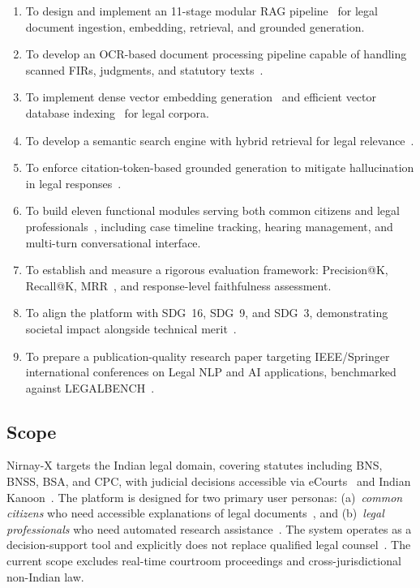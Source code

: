 \documentclass[12pt,a4paper]{article}
\begin{document}
\begin{enumerate}[leftmargin=*, label=\arabic*.]
  \item To design and implement an 11-stage modular RAG pipeline~\cite{lewis2020rag}
    for legal document ingestion, embedding, retrieval, and grounded generation.
  \item To develop an OCR-based document processing pipeline capable of handling
    scanned FIRs, judgments, and statutory texts~\cite{ecourts}.
  \item To implement dense vector embedding generation~\cite{reimers2019sbert} and
    efficient vector database indexing~\cite{manning2008ir} for legal corpora.
  \item To develop a semantic search engine with hybrid retrieval for legal
    relevance~\cite{manning2008ir, reimers2019sbert}.
  \item To enforce citation-token-based grounded generation to mitigate hallucination
    in legal responses~\cite{lewis2020rag}.
  \item To build eleven functional modules serving both common citizens and legal
    professionals~\cite{ashley2017ai}, including case timeline tracking, hearing
    management, and multi-turn conversational interface.
  \item To establish and measure a rigorous evaluation framework: Precision@K,
    Recall@K, MRR~\cite{manning2008ir}, and response-level faithfulness assessment.
  \item To align the platform with SDG~16, SDG~9, and SDG~3, demonstrating
    societal impact alongside technical merit~\cite{const_india, mlaw}.
  \item To prepare a publication-quality research paper targeting IEEE/Springer
    international conferences on Legal NLP and AI applications, benchmarked against
    LEGALBENCH~\cite{guha2023legalbench}.
\end{enumerate}

\subsection{Scope}

Nirnay-X targets the Indian legal domain, covering statutes including BNS, BNSS,
BSA, and CPC, with judicial decisions accessible via eCourts~\cite{ecourts} and
Indian Kanoon~\cite{indiankanoon}. The platform is designed for two primary user
personas: (a)~\textit{common citizens} who need accessible explanations of legal
documents~\cite{const_india}, and (b)~\textit{legal professionals} who need automated
research assistance~\cite{ashley2017ai}. The system operates as a decision-support tool
and explicitly does not replace qualified legal counsel~\cite{mlaw}. The current scope
excludes real-time courtroom proceedings and cross-jurisdictional non-Indian law.
\end{document}
